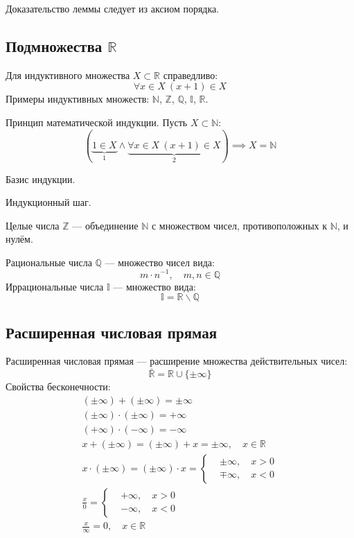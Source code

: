 Доказательство леммы следует из {\ital аксиом порядка}.

\subsection{Подмножества $\mathbb{R}$}

Для {\bold индуктивного} множества $X\subset\mathbb{R}$ справедливо:
$$\forall x\in X\ (x+1)\in X$$
Примеры индуктивных множеств: $\mathbb{N}$, $\mathbb{Z}$, $\mathbb{Q}$, $\mathbb{I}$, $\mathbb{R}$.

\begin{theorem}
{\bold Принцип математической индукции.} Пусть $X\subset\mathbb{N}$:
$$(\underbrace{1\in X}_{1}\land\underbrace{\forall x\in X\ (x+1)\in X}_{2})\implies X=\mathbb{N}$$
\begin{list*}[][\#]
\item Базис индукции.
\item Индукционный шаг.
\end{list*}
\end{theorem}
{\bold Целые числа} $\mathbb{Z}$ --- объединение $\mathbb{N}$ с множеством чисел, противоположных к $\mathbb{N}$, и нулём.

{\bold Рациональные числа} $\mathbb{Q}$ --- множество чисел вида:
$$m\cdot n^{-1},\quad m,n\in\mathbb{Q}$$
{\bold Иррациональные числа} $\mathbb{I}$ --- множество вида:
$$\mathbb{I}=\mathbb{R}\backslash\mathbb{Q}$$

\subsection{Расширенная числовая прямая}

{\bold Расширенная числовая прямая} --- расширение множества действительных 
чисел:
$$\bar{\mathbb{R}}=\mathbb{R}\cup\{\pm\infty\}$$
Свойства бесконечности:
$$\begin{gathered}
(\pm\infty)+(\pm\infty)=\pm\infty\\
(\pm\infty)\cdot(\pm\infty)=+\infty\\
(+\infty)\cdot(-\infty)=-\infty\\
x+(\pm\infty)=(\pm\infty)+x=\pm\infty,\quad x\in\mathbb{R}\\
x\cdot(\pm\infty)=(\pm\infty)\cdot x=\begin{cases*}
&\pm\infty,\quad x\greater 0\\
&\mp\infty,\quad x\less 0
\end{cases*}\\
\frac{x}{0}=\begin{cases*}
&+\infty,\quad x\greater 0\\
&-\infty,\quad x\less 0
\end{cases*}\\
\frac{x}{\infty}=0,\quad x\in\mathbb{R}
\end{gathered}$$

